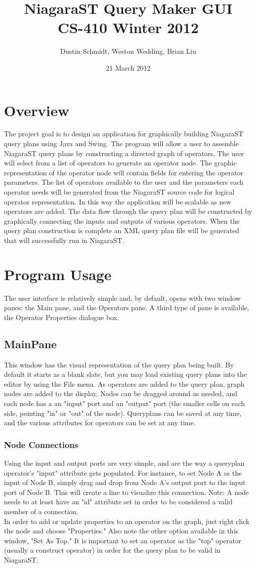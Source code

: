 \documentclass{article}
\title{NiagaraST Query Maker GUI\\
CS-410 Winter 2012}
\author{Dustin Schmidt, Weston Wedding, Brian Liu}
\date{21 March 2012}
\begin{document}
\maketitle
\tableofcontents
	\section{Overview}
	The project goal is to design an application for graphically building NiagaraST query plans using Java and Swing. The program will allow a user to assemble NiagaraST query plans by constructing a directed graph of operators.  The user will select from a list of operators to generate an operator node.  The graphic representation of the operator node will contain fields for entering the operator parameters.  The list of operators available to the user and the parameters each operator needs will be generated from the NiagaraST source code for logical operator representation.  In this way the application will be scalable as new operators are added. The data flow through the query plan will be constructed by graphically connecting the inputs and outputs of various operators.  When the query plan construction is complete an XML query plan file will be generated that will successfully run in NiagaraST. 
\section{Program Usage} The user interface is relatively simple and, by default, opens with two window panes: the Main pane, and the Operators pane.  A third type of pane is available, the Operator Properties dialogue box.
\subsection{MainPane}  This window has the visual representation of the query plan being built.  By default it starts as a blank slate, but you may load existing query plans into the editor by using the File menu.  As operators are added to the query plan, graph nodes are added to the display.  Nodes can be dragged around as needed, and each node has a an "input" port and an "output" port (the smaller cells on each side, pointing "in" or "out" of the node).  Queryplans can be saved at any time, and the various attributes for operators can be set at any time.
\subsubsection{Node Connections}  Using the input and output ports are very simple, and are the way a queryplan operator's "input" attribute gets populated.  For instance, to set Node A as the input of Node B, simply drag and drop from Node A's output port to the input port of Node B.  This will create a line to visualize this connection.  Note: A node needs to at least have an "id" attribute set in order to be considered a valid member of a connection.\\
In order to add or update properties to an operator on the graph, just right click the node and choose "Properties."  Also note the other option available in this window, "Set As Top."  It is important to set an operator as the "top" operator (usually a construct operator) in order for the query plan to be valid in NiagaraST.
\end{document}
